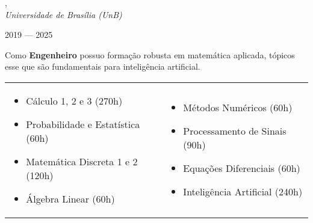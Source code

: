 , \\
\textit{Universidade de Brasília (UnB)}\strut \hfill 2019 --- 2025\\

\vspace*{7pt}

Como \textbf{Engenheiro} possuo formação robusta em matemática aplicada, tópicos esse que são fundamentais para inteligência artificial.

\vspace*{7pt}

\begin{tabular}{@{}ll@{}}
  \begin{minipage}[t]{0.45\textwidth}
    \begin{itemize}
      \item Cálculo 1, 2 e 3 (270h)
      \item Probabilidade e Estatística (60h)
      \item Matemática Discreta 1 e 2 (120h)
      \item Álgebra Linear (60h)
    \end{itemize}
  \end{minipage}
  &
  \begin{minipage}[t]{0.45\textwidth}
    \begin{itemize}
      \item Métodos Numéricos (60h)
      \item Processamento de Sinais (90h)
      \item Equações Diferenciais (60h)
      \item Inteligência Artificial (240h)
    \end{itemize}
  \end{minipage}
\end{tabular}

\vspace*{7pt}

